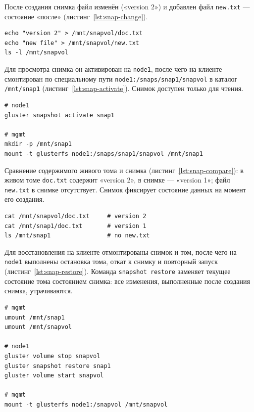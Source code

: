 После создания снимка файл изменён («version 2») и добавлен файл
\texttt{new.txt} --- состояние «после»
(листинг~\ref{lst:snap-change}).

\begin{lstlisting}[caption={Состояние "после" (mgmt)}, label={lst:snap-change}]
echo "version 2" > /mnt/snapvol/doc.txt
echo "new file" > /mnt/snapvol/new.txt
ls -l /mnt/snapvol
\end{lstlisting}

Для просмотра снимка он активирован на \texttt{node1}, после чего
на клиенте смонтирован по специальному пути
\texttt{node1:/snaps/snap1/snapvol} в каталог \texttt{/mnt/snap1}
(листинг~\ref{lst:snap-activate}). Снимок доступен только
для чтения.

\begin{lstlisting}[caption={Активация и монтирование снимка (node1, mgmt)}, label={lst:snap-activate}]
# node1
gluster snapshot activate snap1

# mgmt
mkdir -p /mnt/snap1
mount -t glusterfs node1:/snaps/snap1/snapvol /mnt/snap1
\end{lstlisting}

Сравнение содержимого живого тома и снимка
(листинг~\ref{lst:snap-compare}): в живом томе \texttt{doc.txt}
содержит «version 2», в снимке --- «version 1»; файл
\texttt{new.txt} в снимке отсутствует. Снимок фиксирует
состояние данных на момент его создания.

\begin{lstlisting}[caption={Сравнение живого тома и снимка (mgmt)}, label={lst:snap-compare}]
cat /mnt/snapvol/doc.txt     # version 2
cat /mnt/snap1/doc.txt       # version 1
ls /mnt/snap1                # no new.txt 
\end{lstlisting}

Для восстановления на клиенте отмонтированы снимок и том, после
чего на \texttt{node1} выполнены остановка тома, откат к снимку
и повторный запуск (листинг~\ref{lst:snap-restore}). Команда
\texttt{snapshot restore} заменяет текущее состояние тома
состоянием снимка: все изменения, выполненные после создания
снимка, утрачиваются.

\begin{lstlisting}[caption={Восстановление тома из снимка (mgmt, node1)}, label={lst:snap-restore}]
# mgmt
umount /mnt/snap1
umount /mnt/snapvol

# node1
gluster volume stop snapvol
gluster snapshot restore snap1
gluster volume start snapvol

# mgmt
mount -t glusterfs node1:/snapvol /mnt/snapvol
\end{lstlisting}

